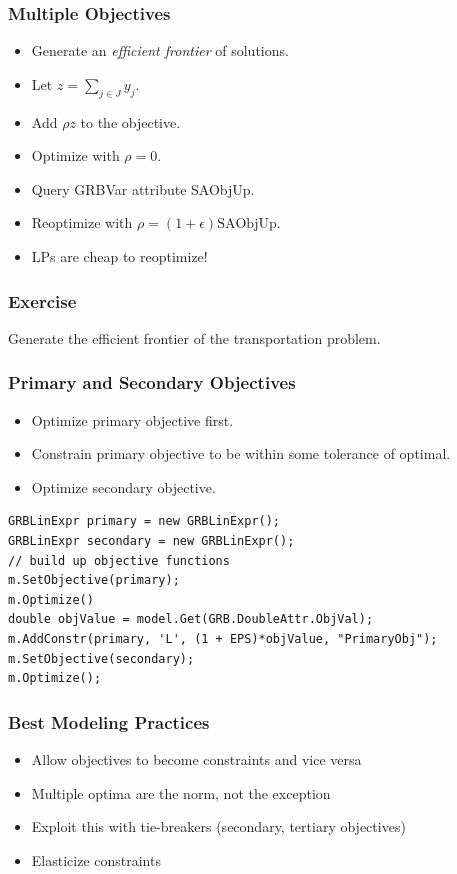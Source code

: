 \documentclass[12pt,handout]{beamer}
\begin{document}
\begin{frame}
\frametitle{Multiple Objectives}
\begin{itemize}
\item Generate an {\em efficient frontier} of solutions.
\item Let $z = \sum_{j \in J} y_j$.
\item Add $\rho z$ to the objective.
\item Optimize with $\rho = 0$.
\item Query GRBVar attribute SAObjUp.
\item Reoptimize with $\rho = (1+\epsilon)\mbox{SAObjUp}$.
\item LPs are cheap to reoptimize!
\end{itemize}
\end{frame}

\begin{frame}
\frametitle{Exercise}
Generate the efficient frontier of the transportation problem.
\end{frame}

\begin{frame} [containsverbatim]
\frametitle{Primary and Secondary Objectives}
\begin{itemize}
\item Optimize primary objective first.
\item Constrain primary objective to be within some tolerance of optimal.
\item Optimize secondary objective.
\end{itemize}
\small
\begin{verbatim}
GRBLinExpr primary = new GRBLinExpr();
GRBLinExpr secondary = new GRBLinExpr();
// build up objective functions
m.SetObjective(primary);
m.Optimize()
double objValue = model.Get(GRB.DoubleAttr.ObjVal);
m.AddConstr(primary, 'L', (1 + EPS)*objValue, "PrimaryObj");
m.SetObjective(secondary);
m.Optimize();
\end{verbatim}
\end{frame}

\begin{frame}
\frametitle{Best Modeling Practices}
\begin{itemize}
\item Allow objectives to become constraints and vice versa
\item Multiple optima are the norm, not the exception
\item Exploit this with tie-breakers (secondary, tertiary objectives)
\item Elasticize constraints
\end{itemize}
\end{frame}
\end{document}
